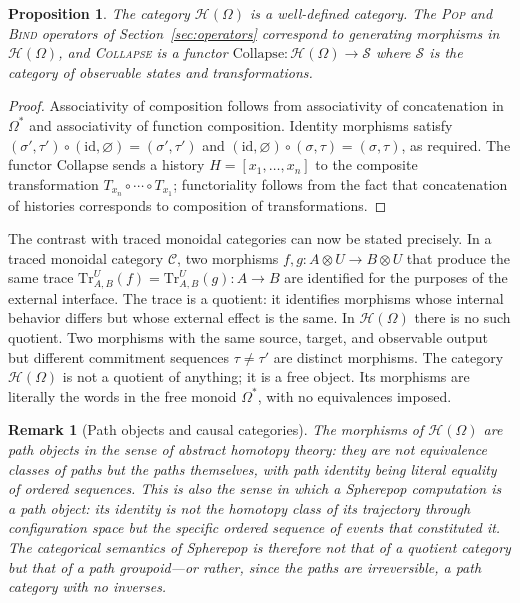\documentclass[12pt]{article}
\newtheorem{proposition}{Proposition}[section]
\newtheorem{remark}{Remark}[section]
\begin{document}
\begin{proposition}
The category $\mathcal{H}(\Omega)$ is a well-defined category. The \textsc{Pop} and \textsc{Bind} operators of Section~\ref{sec:operators} correspond to generating morphisms in $\mathcal{H}(\Omega)$, and \textsc{Collapse} is a functor $\mathrm{Collapse} : \mathcal{H}(\Omega) \to \mathcal{S}$ where $\mathcal{S}$ is the category of observable states and transformations.
\end{proposition}

\begin{proof}
Associativity of composition follows from associativity of concatenation in $\Omega^*$ and associativity of function composition. Identity morphisms satisfy $(\sigma', \tau') \circ (\mathrm{id}, \varnothing) = (\sigma', \tau')$ and $(\mathrm{id}, \varnothing) \circ (\sigma, \tau) = (\sigma, \tau)$, as required. The functor $\mathrm{Collapse}$ sends a history $H = [x_1, \ldots, x_n]$ to the composite transformation $T_{x_n} \circ \cdots \circ T_{x_1}$; functoriality follows from the fact that concatenation of histories corresponds to composition of transformations.
\end{proof}

The contrast with traced monoidal categories can now be stated precisely. In a traced monoidal category $\mathcal{C}$, two morphisms $f, g : A \otimes U \to B \otimes U$ that produce the same trace $\mathrm{Tr}^U_{A,B}(f) = \mathrm{Tr}^U_{A,B}(g) : A \to B$ are identified for the purposes of the external interface. The trace is a quotient: it identifies morphisms whose internal behavior differs but whose external effect is the same. In $\mathcal{H}(\Omega)$ there is no such quotient. Two morphisms with the same source, target, and observable output but different commitment sequences $\tau \neq \tau'$ are distinct morphisms. The category $\mathcal{H}(\Omega)$ is not a quotient of anything; it is a free object. Its morphisms are literally the words in the free monoid $\Omega^*$, with no equivalences imposed.

\begin{remark}[Path objects and causal categories]
The morphisms of $\mathcal{H}(\Omega)$ are path objects in the sense of abstract homotopy theory: they are not equivalence classes of paths but the paths themselves, with path identity being literal equality of ordered sequences. This is also the sense in which a Spherepop computation is a path object: its identity is not the homotopy class of its trajectory through configuration space but the specific ordered sequence of events that constituted it. The categorical semantics of Spherepop is therefore not that of a quotient category but that of a path groupoid---or rather, since the paths are irreversible, a path category with no inverses.
\end{remark}
\end{document}
